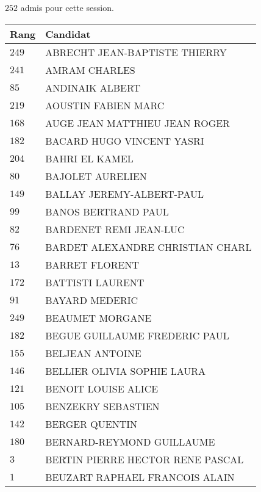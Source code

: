 




  $252$ admis pour cette session.

  \begin{xltabular}{\linewidth}{|l|X|}
    \hline
    \textbf{Rang} & \textbf{Candidat} \\
    \hline
    $249$ & ABRECHT JEAN-BAPTISTE THIERRY \\
    \hline
    $241$ & AMRAM CHARLES \\
    \hline
    $85$ & ANDINAIK ALBERT \\
    \hline
    $219$ & AOUSTIN FABIEN MARC \\
    \hline
    $168$ & AUGE JEAN MATTHIEU JEAN ROGER \\
    \hline
    $182$ & BACARD HUGO VINCENT YASRI \\
    \hline
    $204$ & BAHRI EL KAMEL \\
    \hline
    $80$ & BAJOLET AURELIEN \\
    \hline
    $149$ & BALLAY JEREMY-ALBERT-PAUL \\
    \hline
    $99$ & BANOS BERTRAND PAUL \\
    \hline
    $82$ & BARDENET REMI JEAN-LUC \\
    \hline
    $76$ & BARDET ALEXANDRE CHRISTIAN CHARL \\
    \hline
    $13$ & BARRET FLORENT \\
    \hline
    $172$ & BATTISTI LAURENT \\
    \hline
    $91$ & BAYARD MEDERIC \\
    \hline
    $249$ & BEAUMET MORGANE \\
    \hline
    $182$ & BEGUE GUILLAUME FREDERIC PAUL \\
    \hline
    $155$ & BELJEAN ANTOINE \\
    \hline
    $146$ & BELLIER OLIVIA SOPHIE LAURA \\
    \hline
    $121$ & BENOIT LOUISE ALICE \\
    \hline
    $105$ & BENZEKRY SEBASTIEN \\
    \hline
    $142$ & BERGER QUENTIN \\
    \hline
    $180$ & BERNARD-REYMOND GUILLAUME \\
    \hline
    $3$ & BERTIN PIERRE HECTOR RENE PASCAL \\
    \hline
    $1$ & BEUZART RAPHAEL FRANCOIS ALAIN \\
    \hline

\end{xltabular}
